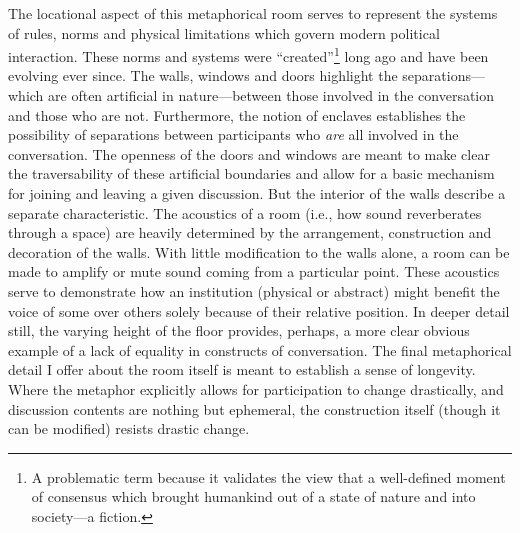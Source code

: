 \documentclass{article}
\begin{document}
The locational aspect of this metaphorical room serves to represent the systems of rules, norms and physical limitations which govern modern political interaction.
These norms and systems were ``created''\footnote{A problematic term because it validates the view that a well-defined moment of consensus which brought humankind out of a state of nature and into society---a fiction.} long ago and have been evolving ever since.
The walls, windows and doors highlight the separations---which are often artificial in nature---between those involved in the conversation and those who are not.
Furthermore, the notion of enclaves establishes the possibility of separations between participants who \emph{are} all involved in the conversation.
The openness of the doors and windows are meant to make clear the traversability of these artificial boundaries and allow for a basic mechanism for joining and leaving a given discussion.
But the interior of the walls describe a separate characteristic.
The acoustics of a room (i.e., how sound reverberates through a space) are heavily determined by the arrangement, construction and decoration of the walls.
With little modification to the walls alone, a room can be made to amplify or mute sound coming from a particular point.
These acoustics serve to demonstrate how an institution (physical or abstract) might benefit the voice of some over others solely because of their relative position.
In deeper detail still, the varying height of the floor provides, perhaps, a more clear obvious example of a lack of equality in constructs of conversation.
The final metaphorical detail I offer about the room itself is meant to establish a sense of longevity.
Where the metaphor explicitly allows for participation to change drastically, and discussion contents are nothing but ephemeral, the construction itself (though it can be modified) resists drastic change.
\end{document}
